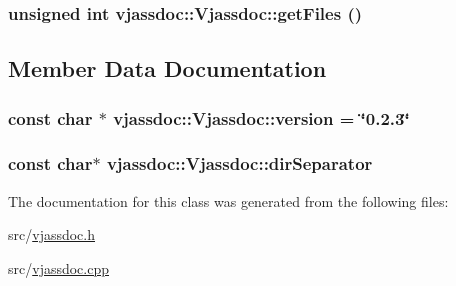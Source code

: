 \hypertarget{classvjassdoc_1_1Vjassdoc_c0b832c86853f4f65c4eb28150808658}{
\subsubsection{\setlength{\rightskip}{0pt plus 5cm}unsigned int vjassdoc::Vjassdoc::getFiles ()}}
\label{classvjassdoc_1_1Vjassdoc_c0b832c86853f4f65c4eb28150808658}




\subsection{Member Data Documentation}
\hypertarget{classvjassdoc_1_1Vjassdoc_229bee6b4735e83a9a28b98eb4650eef}{
\subsubsection{\setlength{\rightskip}{0pt plus 5cm}const char $\ast$ {\bf vjassdoc::Vjassdoc::version} = \char`\"{}0.2.3\char`\"{}}}
\label{classvjassdoc_1_1Vjassdoc_229bee6b4735e83a9a28b98eb4650eef}


\hypertarget{classvjassdoc_1_1Vjassdoc_f3b3e3dfe26a57385265f8ba0d4fef16}{
\subsubsection{\setlength{\rightskip}{0pt plus 5cm}const char$\ast$ {\bf vjassdoc::Vjassdoc::dirSeparator}}}
\label{classvjassdoc_1_1Vjassdoc_f3b3e3dfe26a57385265f8ba0d4fef16}




The documentation for this class was generated from the following files:\begin{CompactItemize}
\item 
src/\hyperlink{vjassdoc_8h}{vjassdoc.h}\item 
src/\hyperlink{vjassdoc_8cpp}{vjassdoc.cpp}\end{CompactItemize}
